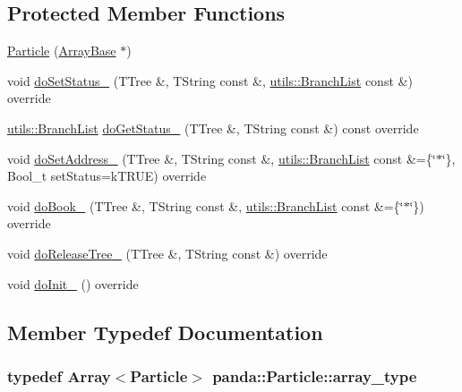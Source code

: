 \subsection*{Protected Member Functions}
\begin{DoxyCompactItemize}
\item 
\hyperlink{classpanda_1_1Particle_a747e6df4d01f0af02a5bafe5d7e66340}{Particle} (\hyperlink{classpanda_1_1ArrayBase}{ArrayBase} $\ast$)
\item 
void \hyperlink{classpanda_1_1Particle_aa30d821beea5e8f3d83580baf162a014}{doSetStatus\_\-} (TTree \&, TString const \&, \hyperlink{classpanda_1_1utils_1_1BranchList}{utils::BranchList} const \&) override
\item 
\hyperlink{classpanda_1_1utils_1_1BranchList}{utils::BranchList} \hyperlink{classpanda_1_1Particle_a7dcbf68bc3e74fdef1e3f3c620fb019a}{doGetStatus\_\-} (TTree \&, TString const \&) const override
\item 
void \hyperlink{classpanda_1_1Particle_a96e604e87ef1bc5931b4cd3da447b084}{doSetAddress\_\-} (TTree \&, TString const \&, \hyperlink{classpanda_1_1utils_1_1BranchList}{utils::BranchList} const \&=\{\char`\"{}$\ast$\char`\"{}\}, Bool\_\-t setStatus=kTRUE) override
\item 
void \hyperlink{classpanda_1_1Particle_a3dab1e8430ed2e287ecd8fdbbdcf3c7e}{doBook\_\-} (TTree \&, TString const \&, \hyperlink{classpanda_1_1utils_1_1BranchList}{utils::BranchList} const \&=\{\char`\"{}$\ast$\char`\"{}\}) override
\item 
void \hyperlink{classpanda_1_1Particle_aff400fb217d44df886826a4ac1f4ca9b}{doReleaseTree\_\-} (TTree \&, TString const \&) override
\item 
void \hyperlink{classpanda_1_1Particle_a3c8e5de4513c492b0bad74e5ba551775}{doInit\_\-} () override
\end{DoxyCompactItemize}


\subsection{Member Typedef Documentation}
\hypertarget{classpanda_1_1Particle_ac7774202a46a6e99815ebbda009cdeff}{
\subsubsection[{array\_\-type}]{\setlength{\rightskip}{0pt plus 5cm}typedef {\bf Array}$<${\bf Particle}$>$ {\bf panda::Particle::array\_\-type}}}
\label{classpanda_1_1Particle_ac7774202a46a6e99815ebbda009cdeff}


